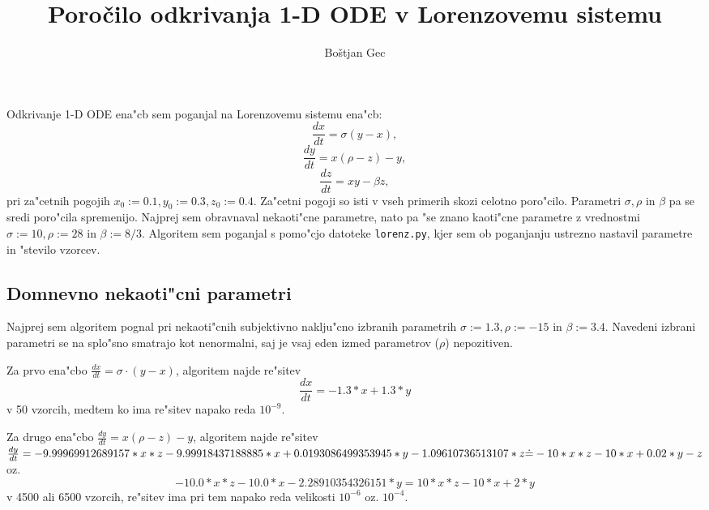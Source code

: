 \documentclass[10pt,a4paper]{article}
\title{Poročilo odkrivanja 1-D ODE v Lorenzovemu sistemu}
\author{Boštjan Gec}
\begin{document}
	\maketitle
    

\newcommand{\round}[2][2]{\( \FPeval{ \p }{round(#2, #1)} \p \)}
\newcommand{\roundNonE}[3][2]{\( \FPeval{ \p }{round(#2 * 10^(#3), #1)} \p\cdot 10^{-#3} \)}
\newcommand{\roundExp}[2][2]{\(
\StrCut{#2}{e}{\coefA}{\order}
\FPeval{\order}{((\order) * (-1))*(-1)} 
\FPclip\order\order  %
\FPeval{\coefA}{round(\coefA, #1)} 
\coefA \cdot 10^{\order}
\)}
\newcommand{\eqiIp}{0.0015054336000000002}
\newcommand{\eqiIpRound}{\roundNonE{\eqiIp}{3}}
\newcommand{\eqiiIp}{ 6.50962591625742e-09  }
\newcommand{\eqiiIpRound}{\roundExp{\eqiiIp}}
\newcommand{\eqiiiIp}{0.0004094779392000001}
\newcommand{\eqiiiIpRound}{\roundNonE{\eqiiiIp}{3}}

Odkrivanje 1-D ODE ena"cb sem poganjal na Lorenzovemu sistemu ena"cb:
$$
\frac{dx}{dt} = \sigma (y-x),
$$ $$
\frac{dy}{dt} = x(\rho-z) - y,
$$ $$
\frac{dz}{dt} = xy - \beta z,
$$
pri za"cetnih pogojih $x_0:=0.1, y_0:=0.3, z_0:=0.4$.
Za"cetni pogoji so isti v vseh primerih skozi celotno poro"cilo.
Parametri $\sigma, \rho$ in $\beta$ pa se sredi poro"cila
spremenijo. Najprej sem obravnaval nekaoti"cne parametre, nato 
pa "se znano kaoti"cne parametre z vrednostmi
$\sigma:=10, \rho:=28$ in $\beta:=8/3$.
Algoritem sem poganjal s pomo"cjo datoteke \verb|lorenz.py|, kjer sem ob poganjanju
ustrezno nastavil parametre in "stevilo vzorcev.

\subsection{Domnevno nekaoti"cni parametri}
Najprej sem algoritem pognal pri nekaoti"cnih subjektivno naklju"cno izbranih parametrih
$\sigma:=1.3, \rho:=-15$ in $\beta:=3.4$.
Navedeni izbrani parametri se na splo"sno smatrajo kot nenormalni, saj je vsaj eden izmed parametrov
($\rho$) nepozitiven.

Za prvo ena"cbo $\frac{dx}{dt} = \sigma \cdot(y-x)$, algoritem najde re"sitev 
$$\frac{dx}{dt} =  -1.3*x + 1.3*y$$ 
v 50 vzorcih, medtem ko ima re"sitev napako reda $10^{-9}$.

Za drugo ena"cbo 
$\frac{dy}{dt} = x(\rho-z) - y$,
algoritem najde re"sitev  \\
$\frac{dy}{dt} = -9.99969912689157*x*z - 9.99918437188885*x 
+ 0.0193086499353945*y - 1.09610736513107*z \\ 
\dot{=} -10*x*z -10*x +0.02*y -z $
\enspace oz. $$-10.0*x*z - 10.0*x - 2.28910354326151*y = 10*x*z -10*x +2*y$$ v 
4500 ali 6500 vzorcih, re"sitev ima pri tem napako 
reda velikosti $10^{-6}$ oz. $10^{-4}$. 
\end{document}
